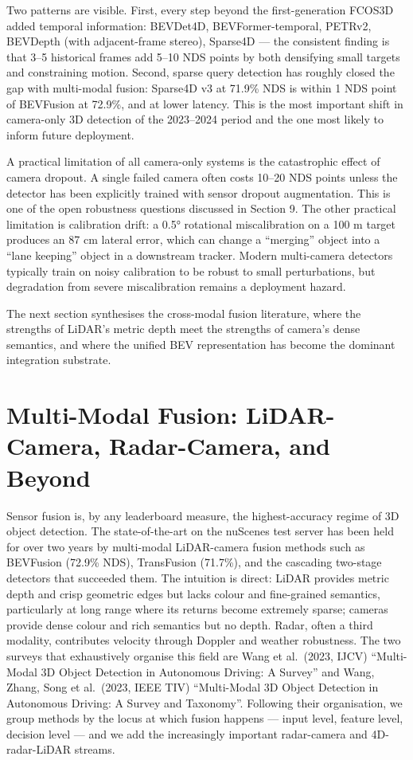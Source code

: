 \documentclass{article}
\begin{document}
Two patterns are visible. First, every step beyond the first-generation FCOS3D added temporal information: BEVDet4D, BEVFormer-temporal, PETRv2, BEVDepth (with adjacent-frame stereo), Sparse4D --- the consistent finding is that 3--5 historical frames add 5--10 NDS points by both densifying small targets and constraining motion. Second, sparse query detection has roughly closed the gap with multi-modal fusion: Sparse4D v3 at 71.9\% NDS is within 1 NDS point of BEVFusion at 72.9\%, and at lower latency. This is the most important shift in camera-only 3D detection of the 2023--2024 period and the one most likely to inform future deployment.

A practical limitation of all camera-only systems is the catastrophic effect of camera dropout. A single failed camera often costs 10--20 NDS points unless the detector has been explicitly trained with sensor dropout augmentation. This is one of the open robustness questions discussed in Section 9. The other practical limitation is calibration drift: a 0.5° rotational miscalibration on a 100 m target produces an 87 cm lateral error, which can change a ``merging'' object into a ``lane keeping'' object in a downstream tracker. Modern multi-camera detectors typically train on noisy calibration to be robust to small perturbations, but degradation from severe miscalibration remains a deployment hazard.

The next section synthesises the cross-modal fusion literature, where the strengths of LiDAR's metric depth meet the strengths of camera's dense semantics, and where the unified BEV representation has become the dominant integration substrate.
\section{Multi-Modal Fusion: LiDAR-Camera, Radar-Camera, and Beyond}\label{sec:multi-modal-fusion-lidar-camera-radar-camera-and-beyond}
Sensor fusion is, by any leaderboard measure, the highest-accuracy regime of 3D object detection. The state-of-the-art on the nuScenes test server has been held for over two years by multi-modal LiDAR-camera fusion methods such as BEVFusion (72.9\% NDS), TransFusion (71.7\%), and the cascading two-stage detectors that succeeded them. The intuition is direct: LiDAR provides metric depth and crisp geometric edges but lacks colour and fine-grained semantics, particularly at long range where its returns become extremely sparse; cameras provide dense colour and rich semantics but no depth. Radar, often a third modality, contributes velocity through Doppler and weather robustness. The two surveys that exhaustively organise this field are Wang et al.~(2023, IJCV) ``Multi-Modal 3D Object Detection in Autonomous Driving: A Survey'' and Wang, Zhang, Song et al.~(2023, IEEE TIV) ``Multi-Modal 3D Object Detection in Autonomous Driving: A Survey and Taxonomy''. Following their organisation, we group methods by the locus at which fusion happens --- input level, feature level, decision level --- and we add the increasingly important radar-camera and 4D-radar-LiDAR streams.
\end{document}
